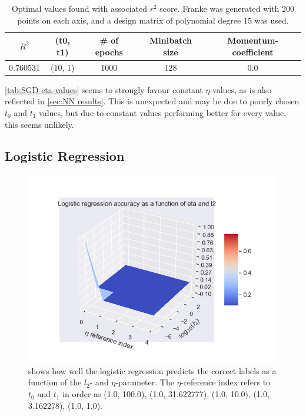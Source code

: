 \documentclass[a4paper, UKenglish]{article}
\newcommand{\0}{\mathbf{0}}
\newcommand{\1}{\mathbf{1}}
\begin{document}
\begin{table}[H] 
\centering
\caption{Optimal values found with associated $r^2$ score. Franke was generated with 200 points on each axis, and a design matrix of polynomial degree 15 was used.}
\label{tab:SGD optimal values}
\begin{tabular}{|c|c|c|c|c|}
	\hline
  $R^2$ & (t0, t1) & \# of epochs & Minibatch size & Momentum-coefficient \\
  \hline
  0.760531 & (10, 1) & 1000 & 128 & 0.0 \\
	\hline
\end{tabular}
\end{table}

\autoref{tab:SGD eta-values} seems to strongly favour constant $\eta$-values, as is also reflected in \autoref{sec:NN results}. This is unexpected and may be due to poorly chosen $t_0$ and $t_1$ values, but due to constant values performing better for every value, this seems unlikely.

\subsection{Logistic Regression}
\begin{figure}[H]
        \centering 
        \includegraphics[scale=0.7]{images/partE_l2andeta.png} 
        \caption{shows how well the logistic regression predicts the correct labels as a function of the $l_2$- and $\eta$-parameter. The $\eta$-reference index refers to $t_0 \text{ and } t_1$ in order as (1.0, 100.0), (1.0, 31.622777), (1.0, 10.0), (1.0, 3.162278), (1.0, 1.0).}
        \label{fig:partE_l2andeta}
\end{figure}
\end{document}
